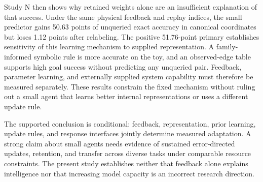\documentclass[11pt]{article}
\begin{document}
Study N then shows why retained weights alone are an insufficient explanation
of that success. Under the same physical feedback and replay indices, the
small predictor gains 50.63 points of unqueried exact accuracy in canonical
coordinates but loses 1.12 points after relabeling. The positive 51.76-point
primary establishes sensitivity of this learning mechanism to supplied
representation. A family-informed symbolic rule is more accurate on the toy,
and an observed-edge table supports high goal success without predicting any
unqueried pair. Feedback, parameter learning, and externally supplied system
capability must therefore be measured separately. These results constrain the
fixed mechanism without ruling out a small agent that learns better internal
representations or uses a different update rule.

The supported conclusion is conditional: feedback, representation, prior
learning, update rules, and response interfaces jointly determine measured
adaptation. A strong claim about small agents needs evidence of sustained
error-directed updates, retention, and transfer across diverse tasks under
comparable resource constraints. The present study establishes neither that
feedback alone explains intelligence nor that increasing model capacity is an
incorrect research direction.
\end{document}

